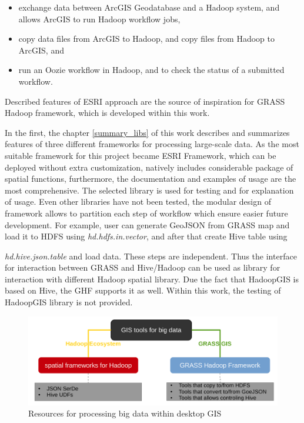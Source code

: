 \documentclass[a4paper,12pt,oneside]{report}
\begin{document}
	\begin{itemize}
		\item exchange data between ArcGIS Geodatabase and a Hadoop system, and allows
		ArcGIS to run Hadoop workflow jobs,
		\item copy data files from ArcGIS to Hadoop, and copy files from Hadoop to
		ArcGIS, and 
		\item run an Oozie workflow in Hadoop, and to check the status of a submitted
		workflow.
	\end{itemize}
	
    Described features of ESRI approach are the source of inspiration for GRASS Hadoop framework, 
    which is developed within this work.
    
    In the first, the chapter \ref{summary_libs} of this work describes and
    summarizes features of three different frameworks for processing large-scale
    data. As the most suitable framework for this project became ESRI Framework, which
    can be deployed without extra customization, natively includes considerable
    package of spatial functions, furthermore, the documentation and examples of
    usage are the most comprehensive. The selected library is used for testing
    and for explanation of usage. Even other libraries have
    not been tested, the modular design of framework allows to partition each step
    of workflow which ensure easier future development. For example,
    user can generate GeoJSON from GRASS map and load it to HDFS using
    \textit{hd.hdfs.in.vector}, and after that create Hive table using

    \textit{hd.hive.json.table} and load data. These steps are independent.
    Thus the interface for interaction between GRASS and
    Hive/Hadoop can be used as library for interaction with different Hadoop spatial library.
    Due the fact that HadoopGIS is based on Hive, the GHF supports it as well. 
    Within this work, the testing of HadoopGIS library is not provided.

	
	\begin{figure}[!htbp]
		\centering
		\includegraphics[width=1\textwidth]{./img/idea_schema.pdf}
		\caption[Resources]{\centering Resources for processing big data within
			desktop GIS}
	\end{figure} 
	
\end{document}
